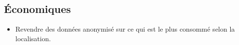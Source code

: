 \subsection{Économiques}
\begin{itemize}
	\item Revendre des données anonymisé sur ce qui est le plus consommé selon la localisation.
\end{itemize}